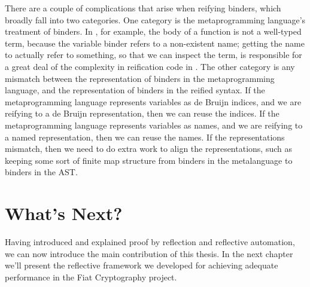 There are a couple of complications that arise when reifying binders, which broadly fall into two categories.
One category is the metaprogramming language's treatment of binders.
In \Ltac, for example, the body of a function is not a well-typed term, because the variable binder refers to a non-existent name; getting the name to actually refer to something, so that we can inspect the term, is responsible for a great deal of the complexity in reification code in \Ltac.
The other category is any mismatch between the representation of binders in the metaprogramming language, and the representation of binders in the reified syntax.
If the metaprogramming language represents variables as de Bruijn indices, and we are reifying to a de Bruijn representation, then we can reuse the indices.
If the metaprogramming language represents variables as names, and we are reifying to a named representation, then we can reuse the names.
If the representations mismatch, then we need to do extra work to align the representations, such as keeping some sort of finite map structure from binders in the metalanguage to binders in the AST.

\section{What's Next?}

Having introduced and explained proof by reflection and reflective automation, we can now introduce the main contribution of this thesis.
In the next chapter we'll present the reflective framework we developed for achieving adequate performance in the Fiat Cryptography project.





